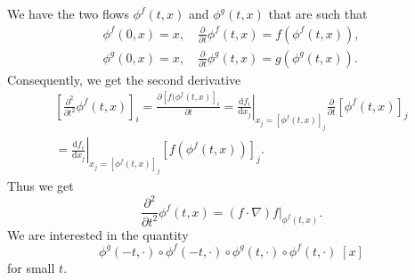 We have the two flows $\phi^f(t,x)$ and $\phi^g(t,x)$ that are such that
\begin{equation}
  \begin{aligned}
    \phi^f(0,x) = x, \quad \frac{\partial }{\partial t} \phi^f(t,x) = f(\phi^f(t,x)), \\
    \phi^g(0,x) = x, \quad \frac{\partial }{\partial t} \phi^g(t,x) = g(\phi^g(t,x)).
  \end{aligned}
\end{equation}
Consequently, we get the second derivative
\begin{equation}
  \begin{aligned}
    \left[ \frac{\partial^2}{\partial t^2} \phi^f(t,x) \right]_i = \frac{\partial \left[ f(\phi^f(t,x)\right] _i}{\partial t} = \left. \frac{\mathrm{d} f_i}{\mathrm{d} x_j} \right|_{x_j = [\phi^f(t,x)]_j} \frac{\partial}{\partial t} \left[ \phi^f (t,x) \right]_j \\
    = \left. \frac{\mathrm{d} f_i}{\mathrm{d} x_j} \right|_{x_j = [\phi^f(t,x)]_j} \left[ f(\phi^f(t,x)) \right]_j.
  \end{aligned}\end{equation}
Thus we get
\begin{equation}
  \frac{\partial^2}{\partial t^2} \phi^f(t,x) =  \left. \left(f \cdot \nabla \right) f \right|_{\phi^f(t,x)}.
\end{equation}
We are interested in the quantity
\begin{equation}
  \phi^g(-t,\cdot) \circ \phi^f(-t,\cdot) \circ \phi^g(t,\cdot) \circ \phi^f(t,\cdot)  \; [x]
\end{equation}
for small $t$.

